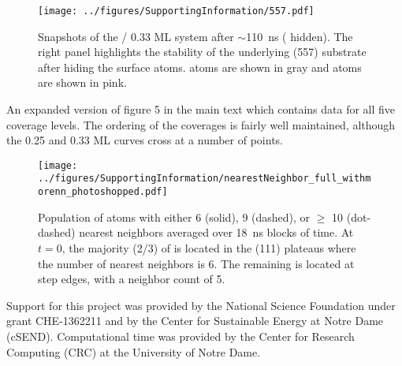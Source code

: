 \documentclass[journal = jpccck, manuscript = suppinfo]{achemso}
\begin{document}
\begin{figure}
  \texttt{[image: ../figures/SupportingInformation/557.pdf]}
  \caption{Snapshots of the / 0.33 ML system after
    $\sim$110~ns ( hidden). The right panel highlights the
    stability of the underlying (557)  substrate after hiding
    the surface  atoms.  atoms are shown in gray and
     atoms are shown in pink.}
\label{fig:557}
\end{figure}

\newpage

An expanded version of figure 5 in the main text which contains data
for all five  coverage levels.  The ordering of the coverages
is fairly well maintained, although the 0.25 and 0.33 ML curves cross
at a number of points.

\begin{figure}
\texttt{[image: ../figures/SupportingInformation/nearestNeighbor\_full\_withmorenn\_photoshopped.pdf]}
\caption{Population of  atoms with either 6 (solid), 9
  (dashed), or $\ge$ 10 (dot-dashed)  nearest neighbors
  averaged over 18~ns blocks of time.  At $t = 0$, the majority
  (2/3) of  is located in the (111) plateaus where
  the number of  nearest neighbors is 6. The remaining 
  is located at step edges, with a neighbor  count of 5.}
\label{fig:nn_full} 
\end{figure}

\newpage

\begin{acknowledgement}
  Support for this project was provided by the National Science
  Foundation under grant CHE-1362211 and by the Center for Sustainable
  Energy at Notre Dame (cSEND). Computational time was provided by the
  Center for Research Computing (CRC) at the University of Notre Dame.
\end{acknowledgement}
\end{document}
